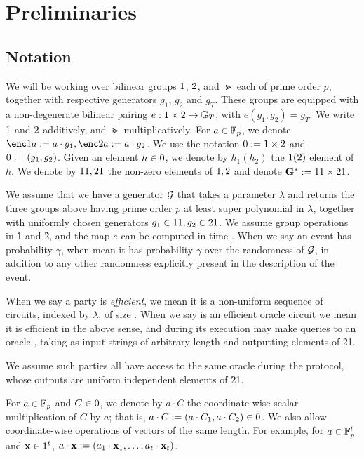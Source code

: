 \documentclass{article}
\begin{document}
\section{Preliminaries}
\label{sec:prelims}
\subsection{Notation}
We will be working over bilinear groups $\G1$, $\G2$, and $\Gt$ each of prime order $p$, together with respective generators $g_1$, $g_2$ and $g_T$.
These groups are equipped with a non-degenerate bilinear pairing $e:\G1 \times \G2 \to \Gt$, with $e(g_1, g_2) = g_T$.
We write $\G1$ and $\G2$ additively, and $\Gt$ multiplicatively.
For $a \in {\mathbb F}_p$, we denote $\enc1{a}\defeq a\cdot g_1, \enc2{a}\defeq a\cdot g_2$.
We use the notation $\G0\defeq \G1\times \G2$ and $\g0\defeq (g_1,g_2)$.
Given an element $h \in \G0$, we denote by $h_1 (h_2)$ the $\G1 (\G2)$ element of $h$.
We denote by $\G11,\G21$ the non-zero elements of $\G1,\G2$ and denote $\GG \defeq \G11\times \G21$.

We assume that we have a generator $\cal G$ that takes a parameter
$\lambda$ and returns the three groups above having prime order $p$ at least super polynomial in $\lambda$, together with uniformly chosen generators
$g_1\in \G11, g_2\in \G21$. We assume group operations in \G1 and \G2, and the map $e$ can be computed in time \poly.
When we say an event has probability $\gamma$,
when mean it has probability $\gamma$ over the randomness of $\cal G$, in addition to any other randomness explicitly present in the description of the event.

When we say a party \adv is \emph{efficient}, we mean it is a non-uniform sequence of circuits, indexed by $\lambda$, 
of size \poly. When we say \adv is an efficient oracle circuit we mean it is efficient in the above sense, and during its execution may make
\poly queries to an oracle \RO, taking as input strings of arbitrary length and outputting elements of \G21.

We assume such parties \adv all have access to the same oracle \RO during the protocol, whose outputs are uniform independent elements of \G21.

For $a\in {\mathbb F}_p$ and $C\in \G0$, we denote by $a\cdot C$ the
coordinate-wise scalar multiplication of $C$ by $a$; that is,
$a\cdot C\defeq (a\cdot C_1,a\cdot C_2) \in \G0$.
We also allow coordinate-wise operations of vectors of the same length.
For example, for $a\in {\mathbb F}_p^t$ and $\inp\in \G1^t$, 
$a\cdot \mathbf{x}:= (a_1\cdot \mathbf{x}_1,\ldots,a_t\cdot \mathbf{x}_t)$.
\end{document}
